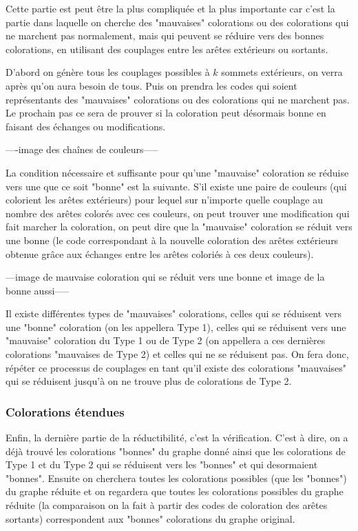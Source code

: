\documentclass[10pt,a4paper]{article}
\begin{document}
Cette partie est peut être la plus compliquée et la plus importante car c'est la partie dans laquelle on cherche des "mauvaises" colorations ou des colorations qui ne marchent pas normalement, mais qui peuvent se réduire vers des bonnes colorations, en utilisant des couplages entre les arêtes extérieurs ou sortants. 

D'abord on génère tous les couplages possibles à $k$ sommets extérieurs, on verra après qu'on aura besoin de tous. Puis on prendra les codes qui soient représentants des "mauvaises" colorations ou des colorations qui ne marchent pas. Le prochain pas ce sera de prouver si la coloration peut désormais bonne en faisant des échanges ou modifications. 

----image des chaînes de couleurs-----

La condition nécessaire et suffisante pour qu'une "mauvaise" coloration se réduise vers une que ce soit "bonne" est la suivante. S'il existe une paire de couleurs (qui colorient les arêtes extérieurs) pour lequel sur n'importe quelle couplage au nombre des arêtes colorés avec ces couleurs, on peut trouver une modification qui fait marcher la coloration, on peut dire que la "mauvaise" coloration se réduit vers une bonne (le code correspondant à la nouvelle coloration des arêtes extérieurs obtenue grâce aux échanges entre les arêtes coloriés à ces deux couleurs).

---image de mauvaise coloration qui se réduit vers une bonne et image de la bonne aussi-----

Il existe différentes types de "mauvaises" colorations, celles qui se réduisent vers une "bonne" coloration (on les appellera Type 1), celles qui se réduisent vers une "mauvaise" coloration du Type 1 ou de Type 2 (on appellera a ces dernières colorations "mauvaises de Type 2) et celles qui ne se réduisent pas. On fera donc, répéter ce processus de couplages en tant qu'il existe des colorations "mauvaises" qui se réduisent jusqu'à on ne trouve plus de colorations de Type 2.

\subsubsection{Colorations étendues}

Enfin, la dernière partie de la réductibilité, c'est la vérification. C'est à dire, on a déjà trouvé les colorations "bonnes" du graphe donné ainsi que les colorations de Type 1 et du Type 2 qui se réduisent vers les "bonnes" et qui desormaient "bonnes". Ensuite on cherchera toutes les colorations possibles (que les "bonnes") du graphe réduite et on regardera que toutes les colorations possibles du graphe réduite (la comparaison on la fait à partir des codes de coloration des arêtes sortants) correspondent aux "bonnes" colorations du graphe original. 
\end{document}
